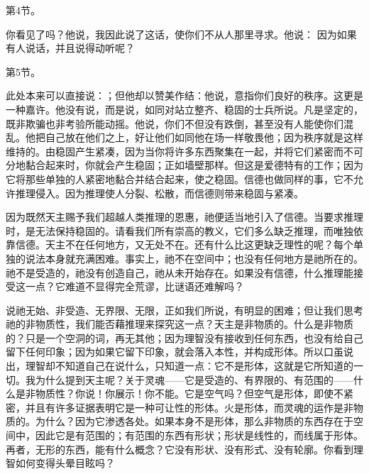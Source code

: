 第4节。\par

你看见了吗？他说，我因此说了这话，使你们不从人那里寻求。他说： 因为如果有人说话，并且说得动听呢？\par

第5节。\par

此处本来可以直接说：；但他却以赞美作结：他说，意指你们良好的秩序。这更是一种嘉许。他没有说，而是说，如同对站立整齐、稳固的士兵所说。凡是坚定的，既非欺骗也非考验所能动摇。他说，你们不但没有跌倒，甚至没有人能使你们混乱。他把自己放在他们之上，好让他们如同他在场一样敬畏他；因为秩序就是这样维持的。由稳固产生紧凑，因为当你将许多东西聚集在一起，并将它们紧密而不可分地黏合起来时，你就会产生稳固；正如墙壁那样。但这是爱德特有的工作；因为它将那些单独的人紧密地黏合并结合起来，使之稳固。信德也做同样的事，它不允许推理侵入。因为推理使人分裂、松散，而信德则带来稳固与紧凑。\par

因为既然天主赐予我们超越人类推理的恩惠，祂便适当地引入了信德。当要求推理时，是无法保持稳固的。请看我们所有崇高的教义，它们多么缺乏推理，而唯独依靠信德。天主不在任何地方，又无处不在。还有什么比这更缺乏理性的呢？每个单独的说法本身就充满困难。事实上，祂不在空间中；也没有任何地方是祂所在的。祂不是受造的，祂没有创造自己，祂从未开始存在。如果没有信德，什么推理能接受这一点？它难道不显得完全荒谬，比谜语还难解吗？\par

说祂无始、非受造、无界限、无限，正如我们所说，有明显的困难；但让我们思考祂的非物质性，我们能否藉推理来探究这一点？天主是非物质的。什么是非物质的？只是一个空洞的词，再无其他；因为理智没有接收到任何东西，也没有给自己留下任何印象；因为如果它留下印象，就会落入本性，并构成形体。所以口虽说出，理智却不知道自己在说什么，只知道一点：它不是形体，这就是它所知道的一切。我为什么提到天主呢？关于灵魂——它是受造的、有界限的、有范围的——什么是非物质性？你说！你展示！你不能。它是空气吗？但空气是形体，即使不紧密，并且有许多证据表明它是一种可让性的形体。火是形体，而灵魂的运作是非物质的。为什么？因为它渗透各处。如果本身不是形体，那么非物质的东西存在于空间中，因此它是有范围的；有范围的东西有形状；形状是线性的，而线属于形体。再者，无形的东西，能有什么概念？它没有形状、没有形式、没有轮廓。你看到理智如何变得头晕目眩吗？\par


